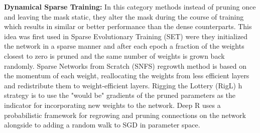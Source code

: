 \textbf{Dynamical Sparse Training:} In this category methods instead of
pruning once and leaving the mask static, they alter the mask during the
course of training which results in similar or better performance than the
dense counterparts.
This idea was first used in Sparse
Evolutionary Training (SET) \cite{mocanuScalableTrainingArtificial2018a} were
they initialized the network in a sparse manner and after
each epoch  a fraction of the weights closest to zero is pruned and the same
number of weights is grown back randomly.
Sparse Networks from Scratch (SNFS) \cite{dettmersSparseNetworksScratch2019}
regrowth method is based on the momentum of each weight, reallocating the weights from less efficient layers and redistribute them to weight-efficient layers.
Rigging the Lottery (RigL)  \cite{evciRiggingLotteryMaking2020}h strategy is to use the
"would be" gradients of the pruned parameters as the indicator for
incorporating new weights to the network. Deep R
\cite{bellecDeepRewiringTraining2018} uses a probabilistic framework for
regrowing and pruning connections on the network alongside to adding a random
walk to SGD in parameter space.
